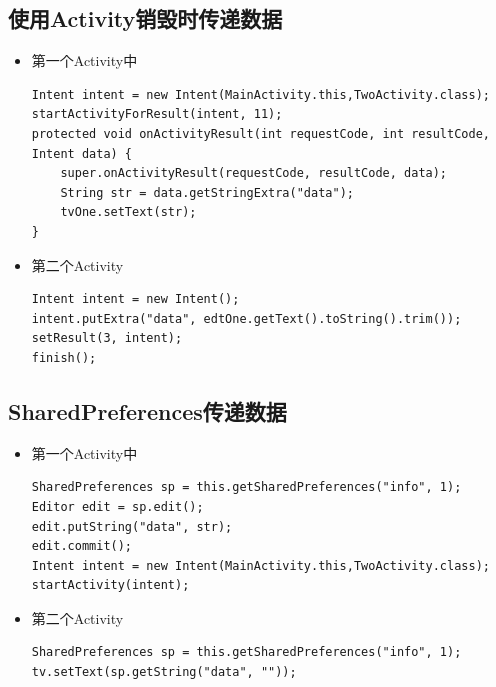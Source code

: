 \documentclass[9pt, b5paaper]{book}
\begin{document}
\subsection{使用Activity销毁时传递数据}
\label{sec-1-6-3}
\begin{itemize}
\item 第一个Activity中
\begin{verbatim}
Intent intent = new Intent(MainActivity.this,TwoActivity.class);
startActivityForResult(intent, 11);
protected void onActivityResult(int requestCode, int resultCode, Intent data) {
    super.onActivityResult(requestCode, resultCode, data);
    String str = data.getStringExtra("data");
    tvOne.setText(str);
}
\end{verbatim}
\item 第二个Activity
\begin{verbatim}
Intent intent = new Intent();
intent.putExtra("data", edtOne.getText().toString().trim());
setResult(3, intent);
finish();
\end{verbatim}
\end{itemize}
\subsection{SharedPreferences传递数据}
\label{sec-1-6-4}
\begin{itemize}
\item 第一个Activity中
\begin{verbatim}
SharedPreferences sp = this.getSharedPreferences("info", 1);
Editor edit = sp.edit();
edit.putString("data", str);
edit.commit();
Intent intent = new Intent(MainActivity.this,TwoActivity.class);
startActivity(intent);
\end{verbatim}
\item 第二个Activity
\begin{verbatim}
SharedPreferences sp = this.getSharedPreferences("info", 1);
tv.setText(sp.getString("data", ""));
\end{verbatim}
\end{itemize}
\end{document}
